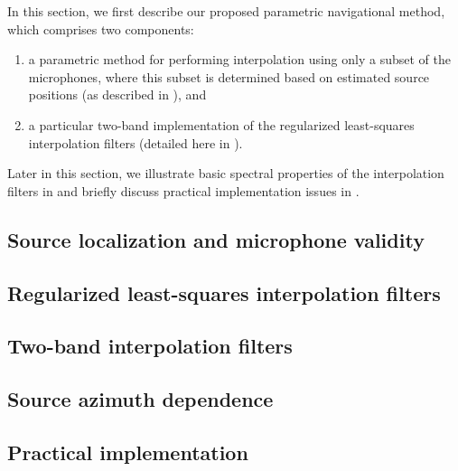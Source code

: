 In this section, we first describe our proposed parametric navigational method, which comprises two components:
\begin{enumerate}
\item a parametric method for performing interpolation using only a subset of the microphones, where this subset is determined based on estimated source positions (as described in ), and
\item a particular two-band implementation of the regularized least-squares interpolation filters (detailed here in ).
\end{enumerate}
Later in this section, we illustrate basic spectral properties of the interpolation filters in  and briefly discuss practical implementation issues in .

\subsection{Source localization and microphone validity}\label{sec:08_Proposed_Method:Microphone_Validity}


\subsection{Regularized least-squares interpolation filters}\label{sec:08_Proposed_Method:Reg-LS_Technique}


\subsection{Two-band interpolation filters}\label{sec:08_Proposed_Method:Hybrid_Technique}


\subsection{Source azimuth dependence}\label{sec:08_Proposed_Method:Azimuth_Dependence}


\subsection{Practical implementation}\label{sec:08_Proposed_Method:Practical_Implementation}
